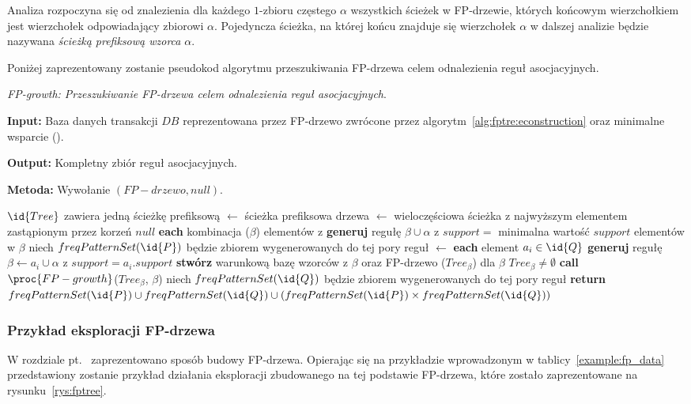 Analiza rozpoczyna się od znalezienia dla każdego $1$-zbioru częstego $\alpha$ wszystkich ścieżek w FP-drzewie, których końcowym wierzchołkiem jest wierzchołek odpowiadający zbiorowi $\alpha$. Pojedyncza ścieżka, na której końcu znajduje się wierzchołek $\alpha$ w dalszej analizie będzie nazywana \emph{ścieżką prefiksową wzorca} $\alpha$.

Poniżej zaprezentowany zostanie pseudokod algorytmu przeszukiwania FP-drzewa celem odnalezienia reguł asocjacyjnych.

\begin{alg}
	\emph{FP-growth: Przeszukiwanie FP-drzewa celem odnalezienia reguł asocjacyjnych}.

	\textbf{Input:} Baza danych transakcji $DB$ reprezentowana przez FP-drzewo zwrócone przez algorytm~\ref{alg:fptre:econstruction} oraz minimalne wsparcie ().

	\textbf{Output:} Kompletny zbiór reguł asocjacyjnych.

	\textbf{Metoda:} Wywołanie $(FP-drzewo, null)$.

	
\begin{codebox}
		\li \If $\id{Tree}$ zawiera jedną ścieżkę prefiksową
			\li \Then
				 $\gets$ ścieżka prefiksowa drzewa 
				\li {} $\gets$ wieloczęściowa ścieżka z najwyższym elementem zastąpionym przez korzeń $null$
					\li \For \textbf{each} kombinacja ($\beta$) elementów z 
						\li \Do
							\textbf{generuj} regułę $\beta \cup \alpha$ z $support =$ minimalna wartość $support$ elementów w $\beta$
							\li niech $freqPatternSet(\id{P})$ będzie zbiorem wygenerowanych do tej pory reguł
						\End
			\li \Else 
				 $\gets$ 
				\li \For \textbf{each} element $a_i \in \id{Q}$
					\li \Do
					\textbf{generuj} regułę $\beta \gets a_i \cup \alpha$ z $support = a_i.support$
					\li \textbf{stwórz} warunkową bazę wzorców z $\beta$ oraz FP-drzewo ($Tree_{\beta}$) dla $\beta$
						\li	\If $Tree_{\beta} \neq \emptyset$
							\li \Then
							\textbf{call} $\proc{FP-growth}$($Tree_{\beta}$, $\beta$)
								\End
							\li niech $freqPatternSet(\id{Q})$ będzie zbiorem wygenerowanych do tej pory reguł
						\End
				\End
		\li \textbf{return} $freqPatternSet(\id{P}) \cup freqPatternSet(\id{Q}) \cup (freqPatternSet(\id{P}) \times freqPatternSet(\id{Q}))$
		\End
\end{codebox}
\end{alg}

\subsubsection{Przykład eksploracji FP-drzewa}
W rozdziale pt.~\emph{} zaprezentowano sposób budowy FP-drzewa. Opierając się na przykładzie wprowadzonym w tablicy~\ref{example:fp_data} przedstawiony zostanie przykład działania eksploracji zbudowanego na tej podstawie FP-drzewa, które zostało zaprezentowane na rysunku~\ref{rys:fptree}.

